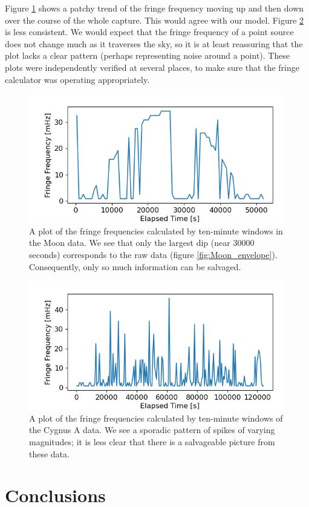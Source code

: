 \documentclass[12pt]{article}
\begin{document}
Figure \ref{fig:Moon_fringes} shows a patchy trend of the fringe frequency moving up and then down over the course of the whole capture. This would agree with our model. Figure \ref{fig:CygA_fringes} is less consistent. We would expect that the fringe frequency of a point source does not change much as it traverses the sky, so it is at least reassuring that the plot lacks a clear pattern (perhaps representing noise around a point). These plots were independently verified at several places, to make sure that the fringe calculator was operating appropriately.

\begin{figure}
	\centering
	\includegraphics[width=.6\linewidth]{fringes/Moon_fringe}
	\caption{A plot of the fringe frequencies calculated by ten-minute windows in the Moon data. We see that only the largest dip (near 30000 seconds) corresponds to the raw data (figure \ref{fig:Moon_envelope}). Consequently, only so much information can be salvaged.}
	\label{fig:Moon_fringes}
\end{figure}

\begin{figure}
	\centering
	\includegraphics[width=.6\linewidth]{fringes/Cyg_fringe}
	\caption{A plot of the fringe frequencies calculated by ten-minute windows of the Cygnus A data. We see a sporadic pattern of spikes of varying magnitudes; it is less clear that there is a salvageable picture from these data.}
	\label{fig:CygA_fringes}
\end{figure}

\section{Conclusions}
\end{document}
